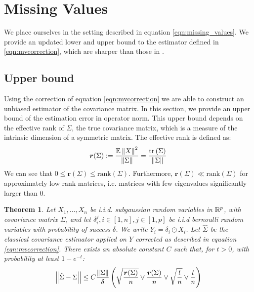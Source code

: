 \documentclass{article}
\numberwithin{equation}{section}
\newcommand{\gregoire}[2][]{\todo[color=orange!20,#1]{{\bf GP:} #2}}
\newtheorem{theorem}{Theorem}
\numberwithin{equation}{section}
\begin{document}
\section{Missing Values}

    We place ourselves in the setting described in equation \ref{eqn:missing_values}. We provide an updated lower and upper bound to the estimator defined in \ref{eqn:mvcorrection}, which are sharper than those in \cite{louniciHighdimensionalCovarianceMatrix2014}.

    \subsection{Upper bound}
    \label{sec:upper_bound}

        Using the correction of equation \ref{eqn:mvcorrection} we are able to construct an unbiased estimator of the covariance matrix. In this section, we provide an upper bound of the estimation error in operator norm. This upper bound depends on the effective rank of $\Sigma$, the true covariance matrix, which is a measure of the intrinsic dimension of a symmetric matrix. The effective rank is defined as:
        \begin{equation}
            \bm{r}(\Sigma) := \frac{\mathbb{E} \left\Vert X \right\Vert^2 }{\left\Vert \Sigma \right\Vert} = \frac{\text{tr}\left(\Sigma\right)}{\left\Vert \Sigma \right\Vert}
        \end{equation}
        We can see that $0 \leq \bm{r}(\Sigma) \leq \text{rank}(\Sigma)$. Furthermore, $\bm{r}(\Sigma) \ll \text{rank}(\Sigma)$ for approximately low rank matrices, i.e. matrices with few eigenvalues significantly larger than $0$.
        
        
        \gregoire{Passer en espace de Hilbert}
        \begin{theorem}
        \label{th:upper}
        Let $X_1, \dots, X_n$ be i.i.d. subgaussian random variables in $\mathbb{R}^p$, with covariance matrix $\Sigma$, and let $\delta_i^j, i \in [1, n], j \in [1,p]$ be i.i.d bernoulli random variables with probability of success $\delta$. We write $Y_i = \delta_i \odot X_i$. Let $\hat{\Sigma}$ be the classical covariance estimator applied on $Y$ corrected as described in equation \ref{eqn:mvcorrection}. There exists an absolute constant $C$ such that, for $t>0$, with probability at least $1-e^{-t}$:
        \begin{equation}
            \left\Vert  \hat{\Sigma} - \Sigma \right\Vert \leq C \frac{\left\Vert \Sigma \right\Vert}{\delta}\left(\sqrt{\frac{\bm{r}(\Sigma)}{n}} \lor \frac{\bm{r}(\Sigma)}{n} \lor \sqrt{\frac{t}{n}} \lor \frac{t}{n}\right)
        \end{equation}
        \end{theorem}
        
\end{document}
